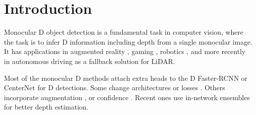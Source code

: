 \documentclass[runningheads]{llncs}
\newcommand{\twoD}{D}
\newcommand{\threeD}{D}
\newcommand{\lidar}{LiDAR}
\begin{document}
\section{Introduction}\label{sec:intro}

    Monocular \threeD{} object detection is a fundamental task in computer vision, where the task is to infer \threeD{} information including depth from a single monocular image. 
    It has applications in augmented reality \cite{alhaija2018augmented},  gaming \cite{rematas2018soccer}, robotics \cite{saxena2008robotic}, and more recently in autonomous driving \cite{brazil2019m3d, simonelli2020disentangling} as a fallback solution for \lidar{}. 

    Most of the monocular \threeD{} methods attach extra heads to the \twoD{} Faster-RCNN \cite{ren2015faster} or CenterNet \cite{zhou2019objects} for \threeD{} detections.
    Some change architectures \cite{liu2019deep,li2020rtm3d,tang2020center3d} or losses \cite{brazil2019m3d,chen2020monopair}. 
    Others incorporate augmentation \cite{simonelli2020towards}, or confidence \cite{ liu2019deep,brazil2020kinematic}. 
    Recent ones use in-network ensembles \cite{zhang2021objects, lu2021geometry} for better depth estimation.
    
\end{document}
